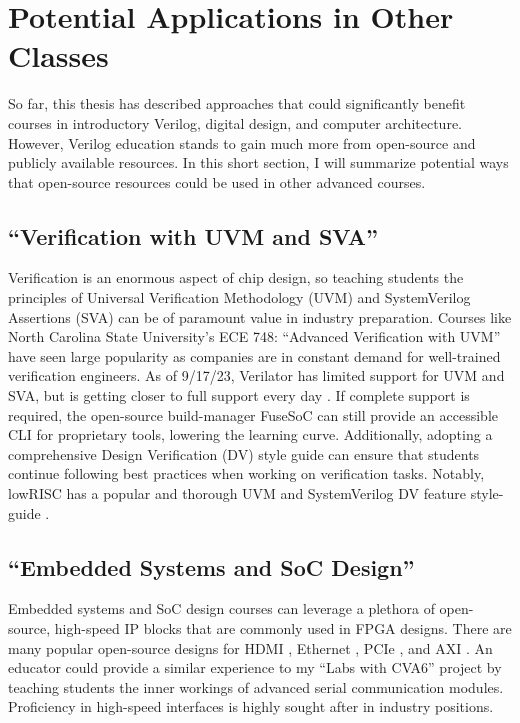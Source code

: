 
\chapter{Potential Applications in Other Classes}
\label{chapter:other_classes}

So far, this thesis has described approaches that could significantly benefit courses in introductory Verilog, digital design, and computer architecture. However, Verilog education stands to gain much more from open-source and publicly available resources. In this short section, I will summarize potential ways that open-source resources could be used in other advanced courses.

\section{``Verification with UVM and SVA''}

Verification is an enormous aspect of chip design, so teaching students the principles of Universal Verification Methodology (UVM) and SystemVerilog Assertions (SVA) can be of paramount value in industry preparation. Courses like North Carolina State University's ECE 748: ``Advanced Verification with UVM'' have seen large popularity as companies are in constant demand for well-trained verification engineers. As of 9/17/23, Verilator has limited support for UVM and SVA, but is getting closer to full support every day \cite{VerilatorUVM, BieganskiORConf, VerilatorSVA}. If complete support is required, the open-source build-manager FuseSoC can still provide an accessible CLI for proprietary tools, lowering the learning curve. Additionally, adopting a comprehensive Design Verification (DV) style guide can ensure that students continue following best practices when working on verification tasks. Notably, lowRISC has a popular and thorough UVM and SystemVerilog DV feature style-guide \cite{lowRISCstyleguides}.

\section{``Embedded Systems and SoC Design''}

Embedded systems and SoC design courses can leverage a plethora of open-source, high-speed IP blocks that are commonly used in FPGA designs. There are many popular open-source designs for HDMI \cite{hdlutilhdmiGitHub, projfdisplaycontrollerGitHub, cliffordwolfSimpleVOutGitHub}, Ethernet \cite{alexforencichverilogethernetGitHub}, PCIe \cite{alexforencichverilogpcieGitHub, enjoydigitallitepcieGitHub}, and AXI \cite{pulpplatformaxiGitHub, alexforencichverilogaxiGitHub}. An educator could provide a similar experience to my ``Labs with CVA6'' project by teaching students the inner workings of advanced serial communication modules. Proficiency in high-speed interfaces is highly sought after in industry positions.

